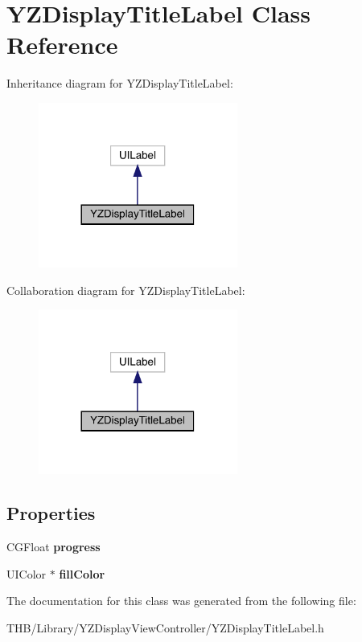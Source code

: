 \hypertarget{interface_y_z_display_title_label}{}\section{Y\+Z\+Display\+Title\+Label Class Reference}
\label{interface_y_z_display_title_label}


Inheritance diagram for Y\+Z\+Display\+Title\+Label\+:\nopagebreak
\begin{figure}[H]
\begin{center}
\leavevmode
\includegraphics[width=185pt]{interface_y_z_display_title_label__inherit__graph}
\end{center}
\end{figure}


Collaboration diagram for Y\+Z\+Display\+Title\+Label\+:\nopagebreak
\begin{figure}[H]
\begin{center}
\leavevmode
\includegraphics[width=185pt]{interface_y_z_display_title_label__coll__graph}
\end{center}
\end{figure}
\subsection*{Properties}
\begin{DoxyCompactItemize}
\item 
\mbox{\label{interface_y_z_display_title_label_af22eade5f85262020d264b592d44960b}} 
C\+G\+Float {\bfseries progress}
\item 
\mbox{\label{interface_y_z_display_title_label_abca2e76cdacea7953a97817e3e782b0e}} 
U\+I\+Color $\ast$ {\bfseries fill\+Color}
\end{DoxyCompactItemize}


The documentation for this class was generated from the following file\+:\begin{DoxyCompactItemize}
\item 
T\+H\+B/\+Library/\+Y\+Z\+Display\+View\+Controller/Y\+Z\+Display\+Title\+Label.\+h\end{DoxyCompactItemize}
